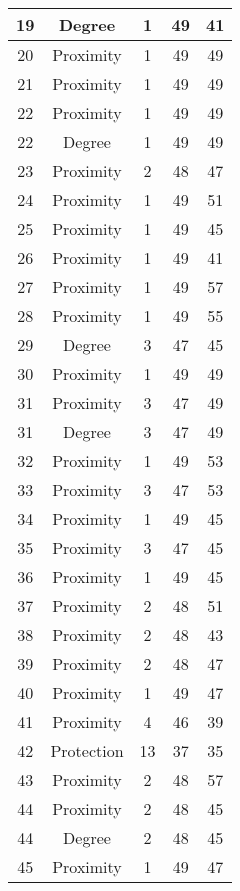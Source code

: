 \documentclass[results.tex]{subfiles}
\begin{document}
\begin{center}
\begin{tabular}{| c || c | c | c | c |}
    \hline
    19 & Degree & 1 & 49 & 41 \\ 
    \hline
    20 & Proximity & 1 & 49 & 49 \\ 
    \hline
    21 & Proximity & 1 & 49 & 49 \\ 
    \hline
    22 & Proximity & 1 & 49 & 49 \\ 
    \hline
    22 & Degree & 1 & 49 & 49 \\ 
    \hline
    23 & Proximity & 2 & 48 & 47 \\ 
    \hline
    24 & Proximity & 1 & 49 & 51 \\ 
    \hline
    25 & Proximity & 1 & 49 & 45 \\ 
    \hline
    26 & Proximity & 1 & 49 & 41 \\ 
    \hline
    27 & Proximity & 1 & 49 & 57 \\ 
    \hline
    28 & Proximity & 1 & 49 & 55 \\ 
    \hline
    29 & Degree & 3 & 47 & 45 \\ 
    \hline
    30 & Proximity & 1 & 49 & 49 \\ 
    \hline
    31 & Proximity & 3 & 47 & 49 \\ 
    \hline
    31 & Degree & 3 & 47 & 49 \\ 
    \hline
    32 & Proximity & 1 & 49 & 53 \\ 
    \hline
    33 & Proximity & 3 & 47 & 53 \\ 
    \hline
    34 & Proximity & 1 & 49 & 45 \\ 
    \hline
    35 & Proximity & 3 & 47 & 45 \\ 
    \hline
    36 & Proximity & 1 & 49 & 45 \\ 
    \hline
    37 & Proximity & 2 & 48 & 51 \\ 
    \hline
    38 & Proximity & 2 & 48 & 43 \\ 
    \hline
    39 & Proximity & 2 & 48 & 47 \\ 
    \hline
    40 & Proximity & 1 & 49 & 47 \\ 
    \hline
    41 & Proximity & 4 & 46 & 39 \\ 
    \hline
    42 & Protection & 13 & 37 & 35 \\ 
    \hline
    43 & Proximity & 2 & 48 & 57 \\ 
    \hline
    44 & Proximity & 2 & 48 & 45 \\ 
    \hline
    44 & Degree & 2 & 48 & 45 \\ 
    \hline
    45 & Proximity & 1 & 49 & 47 \\ 

\end{tabular}
\end{center}
\end{document}
